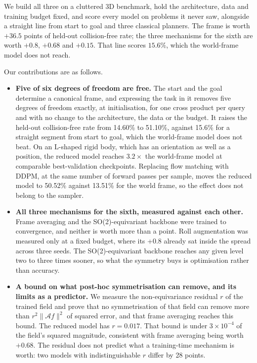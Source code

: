 \documentclass[conference]{IEEEtran}
\begin{document}
We build all three on a cluttered 3D benchmark, hold the architecture, data and
training budget fixed, and score every model on problems it never saw,
alongside a straight line from start to goal and three classical planners. The
frame is worth $+36.5$ points of held-out collision-free rate; the three
mechanisms for the sixth are worth $+0.8$, $+0.68$ and $+0.15$. That line scores
$15.6\%$, which the world-frame model does not reach.

Our contributions are as follows.

\begin{itemize}\itemsep2pt
  \item \textbf{Five of six degrees of freedom are free.} The start and the goal determine a canonical frame, and expressing the task in it removes five degrees of freedom exactly, at initialisation, for one cross product per query and with no change to the architecture, the data or the budget. It raises the held-out collision-free rate from 14.60\% to 51.10\%, against 15.6\% for a straight segment from start to goal, which the world-frame model does not beat. On an L-shaped rigid body, which has an orientation as well as a position, the reduced model reaches $3.2\times$ the world-frame model at comparable best-validation checkpoints. Replacing flow matching with DDPM, at the same number of forward passes per sample, moves the reduced model to 50.52\% against 13.51\% for the world frame, so the effect does not belong to the sampler.

  \item \textbf{All three mechanisms for the sixth, measured against each
  other.} Frame averaging and the SO(2)-equivariant backbone were trained to convergence, and neither is worth more than a point. Roll augmentation was measured only at a fixed budget, where its +0.8 already sat inside the spread across three seeds. The SO(2)-equivariant backbone reaches any given level two to three times sooner, so what the symmetry buys is optimisation rather than accuracy.

  \item \textbf{A bound on what post-hoc symmetrisation can remove, and its limits as a predictor.}
  We measure the non-equivariance residual $r$ of the trained field and prove
that no symmetrisation of that field can remove more than
$r^2\lVert \mathcal{A}f \rVert^2$ of squared error, and that frame averaging
reaches this bound. The reduced model has $r = 0.017$. That bound is under
$3 \times 10^{-4}$ of the field's squared magnitude, consistent with frame
averaging being worth $+0.68$. The residual does not predict what a training-time mechanism is worth: two models with indistinguishable $r$ differ by 28 points.
  

\end{itemize}
\end{document}
